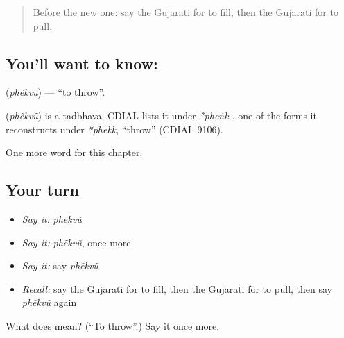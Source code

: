 \label{lesson:GU-C140-phekvu}



\begin{quote}
Before the new one: say the Gujarati for to fill, then the Gujarati for to pull.
\end{quote}

\subsection*{You'll want to know: }
\textbf{} (\emph{phẽkvũ}) — \textquotedblleft{}to throw\textquotedblright{}.

\begin{cousinweb}
\textbf{} (\emph{phẽkvũ}) is a tadbhava. CDIAL lists it under \emph{*pheṅk-}, one of the forms it reconstructs under \emph{*phekk}, \textquotedblleft{}throw\textquotedblright{} (CDIAL 9106).
\end{cousinweb}

\begin{grammarlens}[title={What you've built}]
One more word for this chapter.
\end{grammarlens}

\subsection*{Your turn}
\begin{itemize}
\raggedright
  \item \emph{Say it:} \emph{phẽkvũ}
  \item \emph{Say it:} \emph{phẽkvũ}, once more
  \item \emph{Say it:} say \emph{phẽkvũ}
  \item \emph{Recall:} say the Gujarati for to fill, then the Gujarati for to pull, then say \emph{phẽkvũ} again
\end{itemize}

\begin{tcolorbox}[breakable,colback=teal!4,colframe=teal!35!black,title={Before you move on}]
What does  mean? (\textquotedblleft{}To throw\textquotedblright{}.) Say it once more.
\end{tcolorbox}
